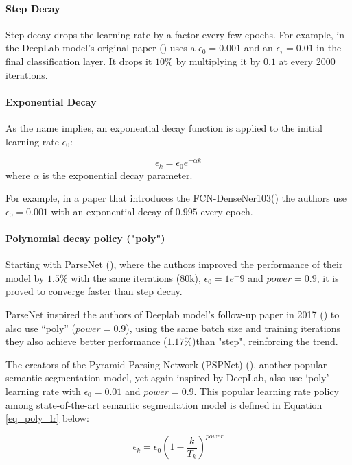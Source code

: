 \paragraph{Step Decay} 
Step decay drops the learning rate by a factor every few epochs. For example, in the DeepLab model's original paper (\cite{chen2016semantic}) uses a $\epsilon_0=0.001$ and an $\epsilon_\tau=0.01$ in the final classification layer. It drops it $10\%$ by multiplying it by $0.1$ at every $2000$ iterations.

\paragraph{Exponential Decay} 
As the name implies, an exponential decay function is applied to the initial learning rate $\epsilon_0$:

\begin{equation} \label{eq_exp_lr}
\epsilon_k = \epsilon_0e^{-\alpha k}
\end{equation} 
where $\alpha$ is the exponential decay parameter.

For example, in a paper that introduces the \gls{FCN}-DenseNer103(\cite{Jegou_2017_CVPR_Workshops}) the authors use $\epsilon_0=0.001$ with an exponential decay of $0.995$ every epoch.

\paragraph{Polynomial decay policy ("poly")} 

Starting with ParseNet (\cite{liu2015parsenet}), where the authors improved the performance of their model by $1.5\%$ with the same iterations (80k), $\epsilon_0= 1e^-9 $ and  $power=0.9$, it is proved to converge faster than step decay. 

ParseNet inspired the authors of Deeplab model's follow-up paper in 2017 (\cite{chen2017deeplab}) to also use “poly” ($power=0.9$), using the same batch size and training iterations they also achieve better performance ($1.17\%$)than "step", reinforcing the trend. 

The creators of the Pyramid Parsing Network (PSPNet) (\cite{zhao2017pyramid}), another popular semantic segmentation model, yet again inspired by DeepLab, also use ‘poly’ learning rate with $\epsilon_0= 0.01$ and $power=0.9$. This popular learning rate policy among state-of-the-art semantic segmentation model is defined in Equation \ref{eq_poly_lr} below:

\begin{equation} \label{eq_poly_lr}
\epsilon_k=\epsilon_0(1- \frac{k}{T_{k}})^{power} 
\end{equation}

